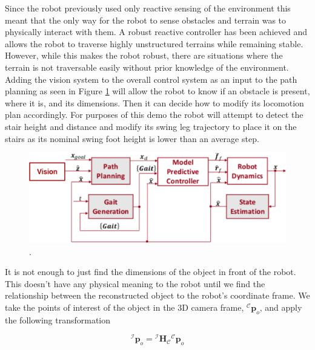Since the robot previously used only reactive sensing of the environment this meant that the only way for the robot to sense obstacles and terrain was to physically interact with them. A robust reactive controller has been achieved and allows the robot to traverse highly unstructured terrains while remaining stable. However, while this makes the robot robust, there are situations where the terrain is not traversable easily without prior knowledge of the environment. Adding the vision system to the overall control system as an input to the path planning as seen in Figure \ref{fig:BD} will allow the robot to know if an obstacle is present, where it is, and its dimensions. Then it can decide how to modify its locomotion plan accordingly. For purposes of this demo the robot will attempt to detect the stair height and distance and modify its swing leg trajectory to place it on the stairs as its nominal swing foot height is lower than an average step.
\begin{figure}[!h]
\centering
\includegraphics[width=\columnwidth]{Figures/BlockDiagram.pdf}
\caption{.}
\label{fig:BD}
\end{figure}

It is not enough to just find the dimensions of the object in front of the robot. This doesn't have any physical meaning to the robot until we find the relationship between the reconstructed object to the robot's coordinate frame. We take the points of interest of the object in the 3D camera frame, ${}^\mathcal{C}\bm{p}_o$, and apply the following transformation

\begin{equation}
{}^\mathcal{I}\bm{p}_o = {}^\mathcal{I}\bm{H}_\mathcal{C}{}^\mathcal{C}\bm{p}_o
\end{equation}

